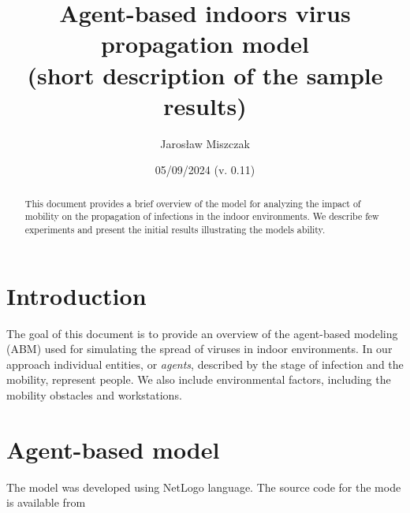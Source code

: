 \documentclass[10pt,a4paper]{article}
\title{Agent-based indoors virus propagation model\\(short description of the sample results)}
\author{Jarosław Miszczak}
\date{05/09/2024 (v. 0.11)}
\begin{document}
\maketitle
\begin{abstract}
	This document provides a brief overview of the model for analyzing the impact of mobility on the propagation of infections in the indoor environments. We describe few experiments and present the initial results illustrating the models ability.
\end{abstract}


\section{Introduction}
The goal of this document is to provide an overview of the agent-based modeling (ABM) used for simulating the spread of viruses in indoor environments. In our approach individual entities, or \emph{agents}, described by the stage of infection and the mobility, represent people. We also include environmental factors, including the mobility obstacles and workstations.

\section{Agent-based model}

The model was developed using NetLogo language. The source code for the mode is available from \cite{model-src}
\end{document}
